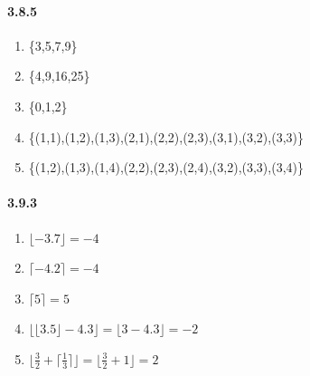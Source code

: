 \documentclass[11pt, letterpaper, twocolumn, fleqn]{article}
\begin{document}
    \paragraph{3.8.5}
    \renewcommand{\labelenumi}{\alph{enumi}.}
    \begin{enumerate}
        \item \{3,5,7,9\}
        \item \{4,9,16,25\}
        \item \{0,1,2\}
        \addtocounter{enumi}{4}
        \item \{(1,1),(1,2),(1,3),(2,1),(2,2),(2,3),(3,1),(3,2),(3,3)\}
        \item \{(1,2),(1,3),(1,4),(2,2),(2,3),(2,4),(3,2),(3,3),(3,4)\}
    \end{enumerate}
    
    \paragraph{3.9.3}
    \renewcommand{\labelenumi}{\alph{enumi}.}
    \begin{enumerate}
        \item $\lfloor -3.7 \rfloor = -4$
        \item $\lceil -4.2 \rceil = -4$
        \item $\lceil 5 \rceil = 5$
        \item $\lfloor \lfloor 3.5 \rfloor - 4.3\rfloor = \lfloor 3 - 4.3 \rfloor = -2 $
        \item $\lfloor \frac{3}{2} + \lceil \frac{1}{3} \rceil \rfloor = \lfloor \frac{3}{2} + 1 \rfloor = 2$
    \end{enumerate}
    
\end{document}
